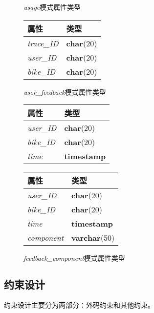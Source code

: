 \begin{figure}[!htp]
    \begin{minipage}{0.3\textwidth}
      \centering
      \caption{\textit{usage}模式属性类型}
      \label{tab:usage}
      \begin{tabular}{ll}\toprule
        属性&类型\\\midrule
       \textit{trace\_ID}&\textbf{char}(20)\\
       \textit{user\_ID}&\textbf{char}(20)\\
       \textit{bike\_ID}&\textbf{char}(20)\\
       \bottomrule
      \end{tabular}
    \end{minipage}\hfill
    \begin{minipage}{0.3\textwidth}
      \centering
      \caption{\textit{user\_feedback}模式属性类型}
      \label{tab:userfeedback}
      \begin{tabular}{ll}\toprule
        属性&类型\\\midrule
       \textit{user\_ID}&\textbf{char}(20)\\
       \textit{bike\_ID}&\textbf{char}(20)\\
       \textit{time}&\textbf{timestamp}\\
       \bottomrule
      \end{tabular}
    \end{minipage}\hfill
    \begin{minipage}{0.3\textwidth}
      \centering
      \caption{\textit{feedback\_component}模式属性类型}
      \label{tab:feedbackcomponent}
      \begin{tabular}{ll}\toprule
        属性&类型\\\midrule
       \textit{user\_ID}&\textbf{char}(20)\\
       \textit{bike\_ID}&\textbf{char}(20)\\
       \textit{time}&\textbf{timestamp}\\
       \textit{component}&\textbf{varchar}(50)\\
       \bottomrule
      \end{tabular}
    \end{minipage}\hfill
  \end{figure}
\subsection{约束设计}
约束设计主要分为两部分：外码约束和其他约束。

